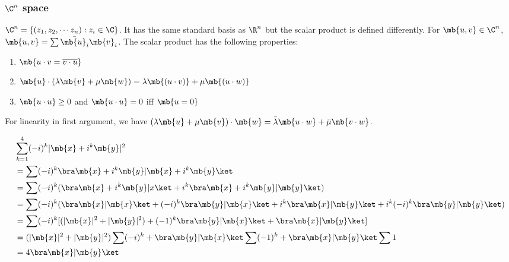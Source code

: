 \documentclass[a4paper]{article}
\begin{document}
\subsubsection{\texorpdfstring{$\C^n$}{Cn} space}
\begin{defi}[$\C^n$]
  $\C^n = \{(z_1, z_2, \cdots z_n): z_i\in\C\}$. It has the same standard basis as $\R^n$ but the scalar product is defined differently. For $\mb{u, v}\in \C^n$, $\mb{u, v} = \sum \bar{\mb{u}_i}\mb{v}_i$. The scalar product has the following properties:
  \begin{enumerate}
  \item $\mb{u\cdot v = \overline{v\cdot u}}$
  \item $\mb{u}\cdot(\lambda\mb{v}+\mu\mb{w}) = \lambda\mb{(u\cdot v)} + \mu\mb{(u\cdot w)}$
  \item $\mb{u\cdot u} \geq 0$ and $\mb{u\cdot u} = 0$ iff $\mb{u = 0}$
  \end{enumerate}
\end{defi}
\note For linearity in first argument, we have $(\lambda\mb{u} + \mu\mb{v})\cdot\mb{w} = \bar{\lambda}\mb{u\cdot w} + \bar \mu\mb{v\cdot w}$.

\begin{eg}
  \begin{align*}
    &\sum_{k = 1}^4 (-i)^k|\mb{x} + i^k\mb{y}|^2\\
    &= \sum(-i)^k\bra\mb{x} + i^k \mb{y}|\mb{x} + i^k\mb{y}\ket\\
    &= \sum(-i)^k (\bra\mb{x} + i^k\mb{y}|x\ket + i^k\bra\mb{x} + i^k\mb{y} | \mb{y}\ket)\\
    &= \sum(-i)^k (\bra\mb{x}|\mb{x}\ket + (-i)^k\bra\mb{y}|\mb{x}\ket + i^k\bra\mb{x}|\mb{y}\ket + i^k(-i)^k\bra\mb{y}|\mb{y}\ket)\\
    &= \sum(-i)^k [(|\mb{x}|^2 + |\mb{y}|^2) + (-1)^k\bra\mb{y}|\mb{x}\ket + \bra\mb{x}|\mb{y}\ket]\\
    &= (|\mb{x}|^2 + |\mb{y}|^2)\sum(-i)^k + \bra\mb{y}|\mb{x}\ket\sum(-1)^k + \bra\mb{x}|\mb{y}\ket\sum1\\
    &= 4\bra\mb{x}|\mb{y}\ket
  \end{align*}
\end{eg}
\end{document}
